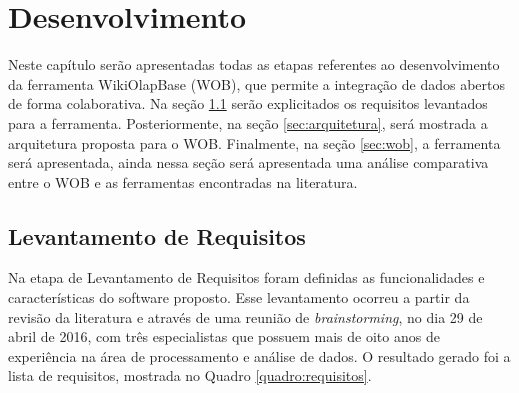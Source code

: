 \chapter{Desenvolvimento}
\label{chap:desenvolvimento}

Neste capítulo serão apresentadas todas as etapas referentes ao desenvolvimento da ferramenta
WikiOlapBase (WOB), que permite a integração de dados abertos de forma colaborativa. Na seção
\ref{sec:requisitos} serão explicitados os requisitos levantados para a ferramenta. 
Posteriormente, na seção \ref{sec:arquitetura}, será mostrada a arquitetura proposta para o 
WOB. Finalmente, na seção \ref{sec:wob}, a ferramenta será apresentada, ainda nessa seção será 
apresentada uma análise comparativa entre o WOB e as ferramentas encontradas na literatura.

\section{Levantamento de Requisitos}
\label{sec:requisitos}

Na etapa de Levantamento de Requisitos foram definidas as funcionalidades e características 
do software proposto. Esse levantamento ocorreu a partir da revisão da literatura e através 
de uma reunião de \textit{brainstorming}, no dia 29 de abril de 2016, com três especialistas 
que possuem mais de oito anos de experiência na área de processamento e análise de dados. 
O resultado gerado foi a lista de requisitos, mostrada no Quadro \ref{quadro:requisitos}.

